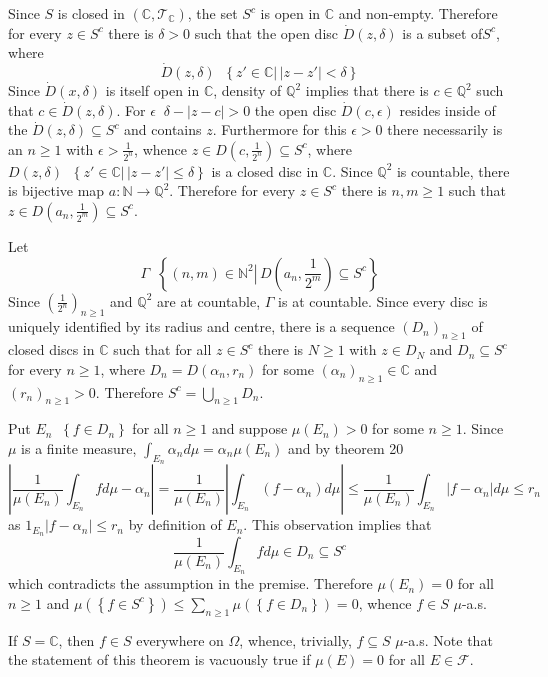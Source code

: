 \documentclass[a4paper]{article}
\newcommand{\obj}[1]{\left\{ #1 \right \}}
\newcommand{\brac}[1]{\left ( #1 \right )}
\newcommand{\induc}[1]{\left . #1 \right \vert}
\newcommand{\abs}[1]{\left | #1 \right |}
\newcommand{\Cplx}{\mathbb{C}}
\newcommand{\Tcal}{\mathcal{T}}
\newcommand{\Fcal}{\mathcal{F}}
\newcommand{\defn}{\mathop{\overset{\Delta}{=}}\nolimits}
\begin{document}
Since $S$ is closed in $\brac{\Cplx, \Tcal_\Cplx}$, the set $S^c$ is open in $\Cplx$ and non-empty. Therefore for every $z\in S^c$ there is $\delta>0$ such that the open disc $\dot{D}\brac{z,\delta}$ is a subset of$S^c$, where \[\dot{D}\brac{z,\delta}\defn \obj{\induc{z'\in \Cplx}\,\abs{z-z'}<\delta}\] Since $\dot{D}\brac{x,\delta}$ is itself open in $\Cplx$, density of $\mathbb{Q}^2$ implies that there is $c\in \mathbb{Q}^2$ such that $c\in \dot{D}\brac{z, \delta}$. For $\epsilon\defn \delta - \abs{z-c}>0$ the open disc $\dot{D}\brac{c, \epsilon}$ resides inside of the $\dot{D}\brac{z,\delta}\subseteq S^c$ and contains $z$. Furthermore for this $\epsilon>0$ there necessarily is an $n\geq 1$ with $\epsilon>\frac{1}{2^n}$, whence $z\in D\brac{c, \frac{1}{2^n}}\subseteq S^c$, where $D\brac{z, \delta}\defn \obj{\induc{z'\in \Cplx}\,\abs{z-z'}\leq \delta}$ is a closed disc in $\Cplx$. Since $\mathbb{Q}^2$ is countable, there is bijective map $a:\mathbb{N}\to\mathbb{Q}^2$. Therefore for every $z\in S^c$ there is $n,m\geq 1$ such that $z\in D\brac{a_n, \frac{1}{2^m}}\subseteq S^c$.

Let \[\Gamma\defn \obj{\induc{\brac{n,m}\in \mathbb{N}^2}\, D\brac{a_n,\frac{1}{2^m}} \subseteq S^c}\] Since $\brac{\frac{1}{2^n}}_{n\geq 1}$ and $\mathbb{Q}^2$ are at countable, $\Gamma$ is at countable. Since every disc is uniquely identified by its radius and centre, there is a sequence $\brac{D_n}_{n\geq1}$ of closed discs in $\Cplx$ such that for all $z\in S^c$ there is $N\geq 1$  with $z\in D_N$ and $D_n\subseteq S^c$ for every $n\geq 1$, where $D_n=D\brac{\alpha_n,r_n}$ for some $\brac{\alpha_n}_{n\geq 1}\in \Cplx$ and $\brac{r_n}_{n\geq1}>0$. Therefore $S^c=\bigcup_{n\geq1} D_n$.

Put $E_n\defn \obj{f\in D_n}$ for all $n\geq 1$ and suppose $\mu\brac{E_n}>0$ for some $n\geq 1$. Since $\mu$ is a finite measure, $\int_{E_n} \alpha_n d\mu = \alpha_n \mu\brac{E_n}$ and by theorem 20 \[\abs{\frac{1}{\mu\brac{E_n}} \int_{E_n} f d\mu - \alpha_n} = \frac{1}{\mu\brac{E_n}} \abs{\int_{E_n} \brac{f - \alpha_n} d\mu} \leq \frac{1}{\mu\brac{E_n}} \int_{E_n} \abs{f-\alpha_n} d\mu \leq r_n\] as $1_{E_n}\abs{f-\alpha_n}\leq r_n$ by definition of $E_n$. This observation implies that \[\frac{1}{\mu\brac{E_n}} \int_{E_n} f d\mu \in D_n\subseteq S^c\] which contradicts the assumption in the premise. Therefore $\mu\brac{E_n}=0$ for all $n\geq 1$ and $\mu\brac{\obj{f\in S^c}}\leq \sum_{n\geq 1}\mu\brac{\obj{f\in D_n}} = 0$, whence $f\in S$ $\mu$-a.s.

If $S=\Cplx$, then $f\in S$ everywhere on $\Omega$, whence, trivially, $f\subseteq S$ $\mu$-a.s. Note that the statement of this theorem is vacuously true if $\mu\brac{E}=0$ for all $E\in \Fcal$.\\
\end{document}
